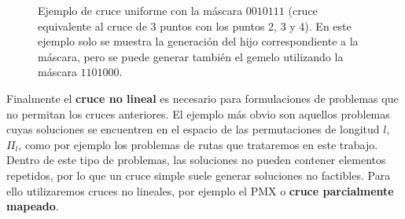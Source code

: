 \begin{figure}[b]
    \centering
    \caption{Ejemplo de cruce uniforme con la máscara $0010111$ (cruce equivalente al cruce de 3 puntos con los puntos 2, 3 y 4). En este ejemplo solo se muestra la generación del hijo correspondiente a la máscara, pero se puede generar también el gemelo utilizando la máscara $1101000$.}
    \label{fig:uxcrossover}
\end{figure}

Finalmente el \textbf{cruce no lineal} es necesario para formulaciones de problemas que no permitan los cruces anteriores. El ejemplo más obvio son aquellos problemas cuyas soluciones se encuentren en el espacio de las permutaciones de longitud $l$, $\Pi_l$, como por ejemplo los problemas de rutas que trataremos en este trabajo. Dentro de este tipo de problemas, las soluciones no pueden contener elementos repetidos, por lo que un cruce simple suele generar soluciones no factibles. Para ello utilizaremos cruces no lineales, por ejemplo el PMX o \textbf{cruce parcialmente mapeado}.\\

